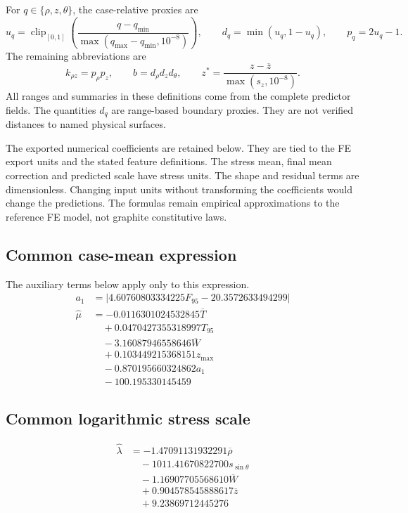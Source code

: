 For $q\in\{\rho,z,\theta\}$, the case-relative proxies are
\begin{equation}
u_q=\operatorname{clip}_{[0,1]}
\left(\frac{q-q_{\min}}{\max(q_{\max}-q_{\min},10^{-8})}\right),
\qquad d_q=\min(u_q,1-u_q),\qquad p_q=2u_q-1.
\end{equation}
The remaining abbreviations are
\begin{equation}
k_{\rho z}=p_\rho p_z,
\qquad b=d_\rho d_z d_\theta,
\qquad z^{*}=\frac{z-\overline z}{\max(s_z,10^{-8})}.
\end{equation}
All ranges and summaries in these definitions come from the complete predictor fields. The quantities $d_q$ are range-based boundary proxies. They are not verified distances to named physical surfaces.

The exported numerical coefficients are retained below. They are tied to the FE export units and the stated feature definitions. The stress mean, final mean correction and predicted scale have stress units. The shape and residual terms are dimensionless. Changing input units without transforming the coefficients would change the predictions. The formulas remain empirical approximations to the reference FE model, not graphite constitutive laws.

\begingroup
\small
\allowdisplaybreaks[1]

\subsection*{Common case-mean expression}
The auxiliary terms below apply only to this expression.
\begin{align*}
a_{1} &= \left|{4.60760803334225 F_{95} - 20.3572633494299}\right| \\
\widehat{\mu} &= - 0.0116301024532845 \overline{T} \\
&\quad + 0.0470427355318997 T_{95} \\
&\quad - 3.16087946558646 \overline{W} \\
&\quad + 0.103449215368151 z_{\max} \\
&\quad - 0.870195660324862 a_{1} \\
&\quad - 100.195330145459
\end{align*}

\subsection*{Common logarithmic stress scale}
\begin{align*}
\widehat{\lambda} &= - 1.47091131932291 \overline{\rho} \\
&\quad - 1011.41670822700 s_{\sin\theta} \\
&\quad - 1.16907705568610 \overline{W} \\
&\quad + 0.904578545888617 \overline{z} \\
&\quad + 9.23869712445276
\end{align*}

